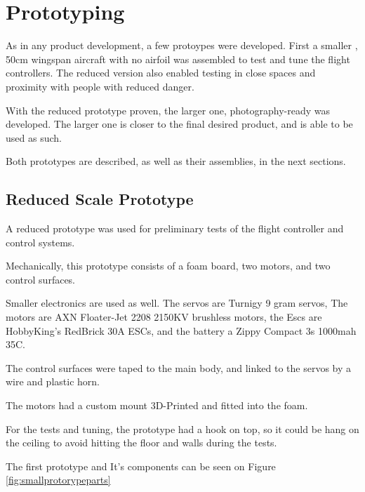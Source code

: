 \chapter{Prototyping} \label{chap:prototyping}

As in any product development, a few protoypes were developed.
First a smaller , 50cm wingspan aircraft with no airfoil was assembled to test and tune the flight controllers. The reduced version also enabled testing in close spaces and proximity with people with reduced danger.

With the reduced prototype proven, the larger one, photography-ready was developed. The larger one is closer to the final desired product, and is able to be used as such.

Both prototypes are described, as well as their assemblies, in the next sections.
 


\section{Reduced Scale Prototype}

A reduced prototype was used for preliminary tests of the flight controller and control systems.

Mechanically, this prototype consists of a foam board, two motors, and two control surfaces.

Smaller electronics are used as well. The servos are Turnigy 9 gram servos, The motors are AXN Floater-Jet 2208 2150KV brushless motors, the Escs are HobbyKing's RedBrick 30A ESCs, and the battery a Zippy Compact 3s 1000mah 35C.

The control surfaces were taped to the main body, and linked to the servos by a wire and plastic horn.

The motors had a custom mount 3D-Printed and fitted into the foam.

For the tests and tuning, the prototype had a hook on top, so it could be hang on the ceiling to avoid hitting the floor and walls during the tests.

The first prototype and It's components can be seen on Figure \ref{fig:smallprotorypeparts}

